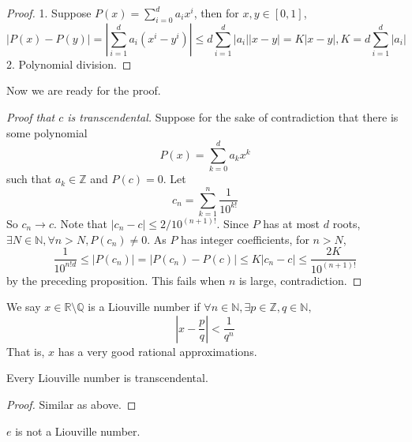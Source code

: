 \begin{proof}
    1. Suppose $P(x)=\sum_{i=0}^da_ix^i$, then for $x,y\in[0,1]$,
    $$|P(x)-P(y)|=\left|\sum_{i=1}^da_i(x^i-y^i)\right|\le d\sum_{i=1}^d|a_i||x-y|=K|x-y|,K=d\sum_{i=1}^d|a_i|$$
    2. Polynomial division.
\end{proof}
Now we are ready for the proof.
\begin{proof}[Proof that $c$ is transcendental]
    Suppose for the sake of contradiction that there is some polynomial
    $$P(x)=\sum_{k=0}^da_kx^k$$
    such that $a_k\in\mathbb Z$ and $P(c)=0$.
    Let
    $$c_n=\sum_{k=1}^n \frac{1}{10^{k!}}$$
    So $c_n\to c$.
    Note that $|c_n-c|\le 2/10^{(n+1)!}$.
    Since $P$ has at most $d$ roots, $\exists N\in\mathbb N,\forall n>N,P(c_n)\neq 0$.
    As $P$ has integer coefficients, for $n>N$,
    $$\frac{1}{10^{n!d}}\le|P(c_n)|=|P(c_n)-P(c)|\le K|c_n-c|\le\frac{2K}{10^{(n+1)!}}$$
    by the preceding proposition.
    This fails when $n$ is large, contradiction.
\end{proof}
\begin{definition}
    We say $x\in\mathbb R\setminus\mathbb Q$ is a Liouville number if $\forall n\in\mathbb N,\exists p\in\mathbb Z,q\in\mathbb N,$
    $$\left|x-\frac{p}{q}\right|<\frac{1}{q^n}$$
    That is, $x$ has a very good rational approximations.
\end{definition}
\begin{theorem}
    Every Liouville number is transcendental.
\end{theorem}
\begin{proof}
    Similar as above.
\end{proof}
\begin{remark}
    $e$ is not a Liouville number.
\end{remark}
